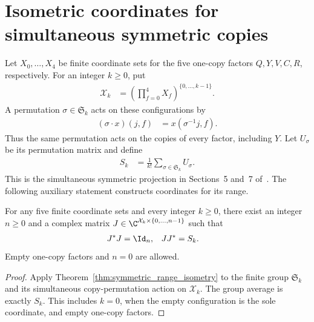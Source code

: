 \section{Isometric coordinates for simultaneous symmetric copies}
\label{sec:replica_symmetric_range_isometry}

Let $X_0,\ldots,X_4$ be finite coordinate sets for the five one-copy
factors $Q,Y,V,C,R$, respectively. For an integer $k\geq0$, put
\begin{align}
  \mathcal X_k
    &=\left(\prod_{f=0}^4X_f\right)^{\{0,\ldots,k-1\}}.
\end{align}
A permutation $\sigma\in\mathfrak S_k$ acts on these configurations by
\begin{align}
  (\sigma\cdot x)(j,f)&=x(\sigma^{-1}j,f).
\end{align}
Thus the same permutation acts on the copies of every factor,
including $Y$. Let $U_\sigma$ be its permutation matrix and define
\begin{align}
  S_k&=\frac1{k!}\sum_{\sigma\in\mathfrak S_k}U_\sigma.
\end{align}
This is the simultaneous symmetric projection in Sections~5 and~7
of~\cite{OpenAI2026AreaLaw}. The following auxiliary statement
constructs coordinates for its range.

\begin{theorem}
  \label{thm:replica_symmetric_range_isometry}
  \leanok
  For any five finite coordinate sets and every integer $k\geq0$,
  there exist an integer $n\geq0$ and a complex matrix
  $J\in\C^{\mathcal X_k\times\{0,\ldots,n-1\}}$ such that
  \begin{align}
    J^*J&=\Id_n,& JJ^*&=S_k.
  \end{align}
  Empty one-copy factors and $n=0$ are allowed.
\end{theorem}

\begin{proof}
  \leanok
  Apply Theorem~\ref{thm:symmetric_range_isometry} to the finite group
  $\mathfrak S_k$ and its simultaneous copy-permutation action on
  $\mathcal X_k$. The group average is exactly $S_k$.
  This includes $k=0$, when the empty configuration is the sole
  coordinate, and empty one-copy factors.
\end{proof}
